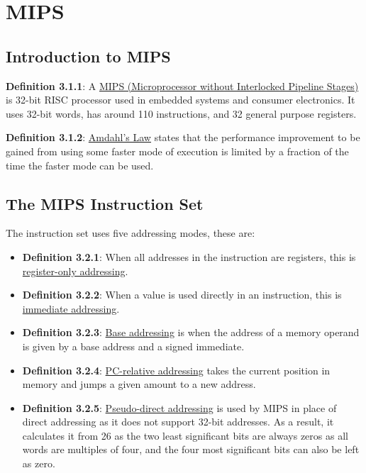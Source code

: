 \documentclass{article}
\newcommand{\separate}[1] {\vspace{#1 pt}\noindent}
\newcommand{\definition}[2]{\textbf{Definition #1}: #2\label{def:#1}}
\begin{document}
\section{MIPS}

\subsection{Introduction to MIPS}

\definition{3.1.1}{A \underline{MIPS (Microprocessor without Interlocked Pipeline Stages)} is 32-bit RISC processor used in embedded systems and consumer electronics. It uses 32-bit words, has around 110 instructions, and 32 general purpose registers.}

\separate{7}\definition{3.1.2}{\underline{Amdahl's Law} states that the performance improvement to be gained from using some faster mode of execution is limited by a fraction of the time the faster mode can be used.}

\subsection{The MIPS Instruction Set}

The instruction set uses five addressing modes, these are:
\begin{itemize}
    \item \definition{3.2.1}{When all addresses in the instruction are registers, this is \underline{register-only addressing}.}
    \item \definition{3.2.2}{When a value is used directly in an instruction, this is \underline{immediate addressing}.}
    \item \definition{3.2.3}{\underline{Base addressing} is when the address of a memory operand is given by a base address and a signed immediate.}
    \item \definition{3.2.4}{\underline{PC-relative addressing} takes the current position in memory and jumps a given amount to a new address.}
    \item \definition{3.2.5}{\underline{Pseudo-direct addressing} is used by MIPS in place of direct addressing as it does not support 32-bit addresses. As a result, it calculates it from 26 as the two least significant bits are always zeros as all words are multiples of four, and the four most significant bits can also be left as zero.}
\end{itemize}
\end{document}
